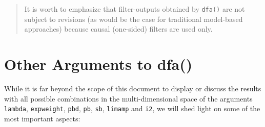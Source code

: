 \documentclass[a4paper]{article}
\begin{document}
\begin{quote}It is worth to emphasize that filter-outputs obtained by
  \texttt{dfa()} are not subject to revisions (as would be the case
  for traditional model-based approaches) because causal (one-sided)
  filters are used only. \end{quote}

\section{Other Arguments to dfa()}

While it is far beyond the scope of this document to display or
discuss the results with all possible combinations in the
multi-dimensional space of the arguments \texttt{lambda},
\texttt{expweight}, \texttt{pbd}, \texttt{pb}, \texttt{sb},
\texttt{limamp} and \texttt{i2}, we will shed light on some of the
most important aspects:
\end{document}
